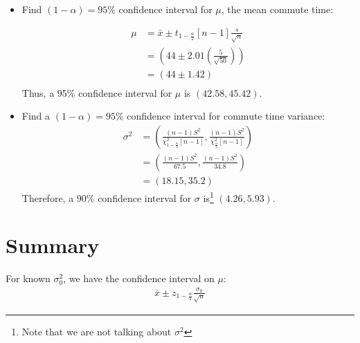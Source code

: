                     \begin{itemize}
                        \item Find $(1 - \alpha) = 95\%$ confidence interval for $\mu$, the mean commute time:

                            \begin{align*}
                                \mu &= \bar{x} \pm t_{1 - \frac{\alpha}{2}}[n-1] \frac{s}{\sqrt{n}} \\
                                &= (44 \pm 2.01\left( \frac{5}{\sqrt{50}} \right)) \\
                                &= (44 \pm 1.42) \\
                            \end{align*}
                            Thus, a 95\% confidence interval for $\mu$ is $(42.58, 45.42)$.
                        \item Find a $(1 - \alpha) = 95\%$ confidence interval for commute time variance:
                            \begin{align*}
                                \sigma^2 &=
                                    \left(
                                        \frac{(n-1)S^2}{\chi_{1-\frac{\alpha}{2}}^2 [n - 1]},
                                        \frac{(n-1)S^2}{\chi_{\frac{\alpha}{2}}^2 [n - 1]}
                                    \right) \\
                                &=
                                    \left(
                                        \frac{(n-1)S^2}{67.5},
                                        \frac{(n-1)S^2}{34.8}
                                    \right) \\
                                &= \left( 18.15, 35.2 \right)
                            \end{align*}
                            Therefore, a 90\% confidence interval for $\sigma$ is\footnote{Note that we are not talking about $\sigma^2$} $(4.26, 5.93)$.
                    \end{itemize}
            \section{Summary} %
            \label{sec:summary}
                For known $\sigma_0^2$, we have the confidence interval on $\mu$:
                \begin{align*}
                    \bar{x} \pm z_{1 - \frac{\alpha}{2}} \frac{\sigma_0}{\sqrt{n}}
                \end{align*}

